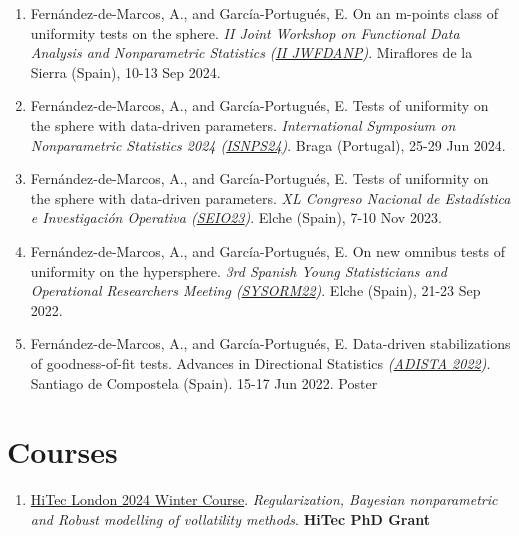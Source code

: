 \begin{enumerate}
  \item Fernández-de-Marcos, A., and García-Portugués, E. On an m-points class of uniformity tests on the sphere. \emph{II Joint Workshop on Functional Data Analysis and Nonparametric Statistics (\href{https://iiwfdanp.webnode.page/}{II JWFDANP})}. Miraflores de la Sierra (Spain), 10-13 Sep 2024.
  \item Fernández-de-Marcos, A., and García-Portugués, E. Tests of uniformity on the sphere with data-driven parameters. \emph{International Symposium on Nonparametric Statistics 2024 (\href{https://w3.math.uminho.pt/ISNPS2024/}{ISNPS24})}. Braga (Portugal), 25-29 Jun 2024.
  \item Fernández-de-Marcos, A., and García-Portugués, E. Tests of uniformity on the sphere with data-driven parameters. \emph{XL Congreso Nacional de Estadística e Investigación Operativa (\href{https://seio2023.com/}{SEIO23})}. Elche (Spain), 7-10 Nov 2023.
  \item Fernández-de-Marcos, A., and García-Portugués, E. On new omnibus tests of uniformity on the hypersphere. \emph{3rd Spanish Young Statisticians and Operational Researchers Meeting (\href{https://sysorm.umh.es/}{SYSORM22})}. Elche (Spain), 21-23 Sep 2022.
  \item Fernández-de-Marcos, A., and García-Portugués, E. Data-driven stabilizations of goodness-of-fit tests. Advances in Directional Statistics \emph{(\href{http://eio.usc.es/pub/adista20/index.php/2-uncategorised/1-home}{ADISTA 2022})}. Santiago de Compostela (Spain). 15-17 Jun 2022. Poster
\end{enumerate}

\section*{Courses}

\begin{enumerate}
  \item \href{https://www.hitecaction.org/london2024course.php}{HiTec London 2024 Winter Course}. \emph{Regularization, Bayesian nonparametric and Robust modelling of vollatility methods}. \textbf{HiTec PhD Grant}
\end{enumerate}
